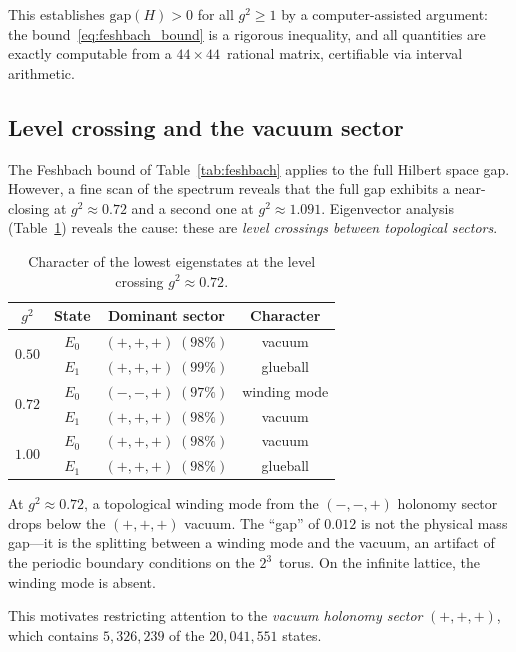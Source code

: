 \documentclass[12pt,a4paper]{article}
\begin{document}
This establishes $\mathrm{gap}(H)>0$ for all $g^2\ge 1$ by a computer-assisted argument: the bound~\eqref{eq:feshbach_bound} is a rigorous inequality, and all quantities are exactly computable from a $44\times 44$~rational matrix, certifiable via interval arithmetic.

\subsection{Level crossing and the vacuum sector}\label{sec:level_crossing}

The Feshbach bound of Table~\ref{tab:feshbach} applies to the full Hilbert space gap. However, a fine scan of the spectrum reveals that the full gap exhibits a near-closing at $g^2\approx 0.72$ and a second one at $g^2\approx 1.091$. Eigenvector analysis (Table~\ref{tab:crossing}) reveals the cause: these are \emph{level crossings between topological sectors}.

\begin{table}[ht]
\centering
\caption{Character of the lowest eigenstates at the level crossing $g^2\approx 0.72$.}
\label{tab:crossing}
\begin{tabular}{@{}cccc@{}}
\toprule
$g^2$ & State & Dominant sector & Character \\
\midrule
\multirow{2}{*}{$0.50$} & $E_0$ & $(+,+,+)\;(98\%)$ & vacuum \\
& $E_1$ & $(+,+,+)\;(99\%)$ & glueball \\
\midrule
\multirow{2}{*}{$0.72$} & $E_0$ & $(-,-,+)\;(97\%)$ & winding mode \\
& $E_1$ & $(+,+,+)\;(98\%)$ & vacuum \\
\midrule
\multirow{2}{*}{$1.00$} & $E_0$ & $(+,+,+)\;(98\%)$ & vacuum \\
& $E_1$ & $(+,+,+)\;(98\%)$ & glueball \\
\bottomrule
\end{tabular}
\end{table}

At $g^2\approx 0.72$, a topological winding mode from the $(-,-,+)$ holonomy sector drops below the $(+,+,+)$ vacuum. The ``gap'' of $0.012$ is not the physical mass gap---it is the splitting between a winding mode and the vacuum, an artifact of the periodic boundary conditions on the $2^3$~torus. On the infinite lattice, the winding mode is absent.

This motivates restricting attention to the \emph{vacuum holonomy sector} $(+,+,+)$, which contains $5{,}326{,}239$ of the $20{,}041{,}551$ states.
\end{document}
